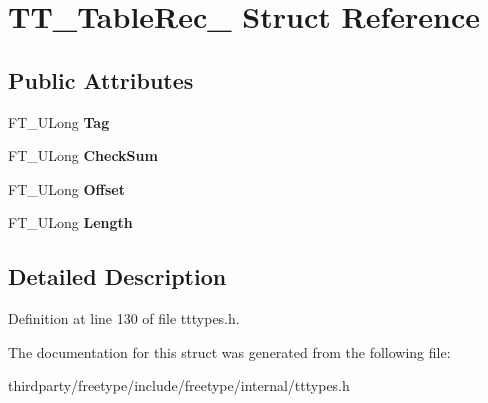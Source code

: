 \hypertarget{struct_t_t___table_rec__}{}\section{T\+T\+\_\+\+Table\+Rec\+\_\+ Struct Reference}
\label{struct_t_t___table_rec__}
\subsection*{Public Attributes}
\begin{DoxyCompactItemize}
\item 
\mbox{\label{struct_t_t___table_rec___aaccaf9e9d3421fc37fa6e51875534995}} 
F\+T\+\_\+\+U\+Long {\bfseries Tag}
\item 
\mbox{\label{struct_t_t___table_rec___aacf9207fae3522bb65359c2288900fca}} 
F\+T\+\_\+\+U\+Long {\bfseries Check\+Sum}
\item 
\mbox{\label{struct_t_t___table_rec___a91840e1cee040f8da6a34a081dda17b6}} 
F\+T\+\_\+\+U\+Long {\bfseries Offset}
\item 
\mbox{\label{struct_t_t___table_rec___aa0d3a1f4491bf4418bc26241bdd7d21b}} 
F\+T\+\_\+\+U\+Long {\bfseries Length}
\end{DoxyCompactItemize}


\subsection{Detailed Description}


Definition at line 130 of file tttypes.\+h.



The documentation for this struct was generated from the following file\+:\begin{DoxyCompactItemize}
\item 
thirdparty/freetype/include/freetype/internal/tttypes.\+h\end{DoxyCompactItemize}
